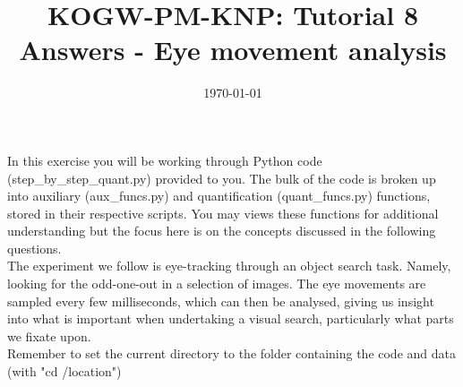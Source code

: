 \documentclass[12pt,english]{scrartcl}
\title{KOGW-PM-KNP: Tutorial 8 Answers - Eye movement analysis}
\author{}
\date{\today}
\begin{document}
\maketitle
In this exercise you will be working through Python code (step\_by\_step\_quant.py) provided to you. The bulk of the code is broken up into auxiliary (aux\_funcs.py) and quantification (quant\_funcs.py) functions, stored in their respective scripts. You may views these functions for additional understanding but the focus here is on the concepts discussed in the following questions. \\

The experiment we follow is eye-tracking through an object search task. Namely, looking for the odd-one-out in a selection of images. The eye movements are sampled every few milliseconds, which can then be analysed, giving us insight into what is important when undertaking a visual search, particularly what parts we fixate upon. \\

Remember to set the current directory to the folder containing the code and data (with "cd /location")
\end{document}
